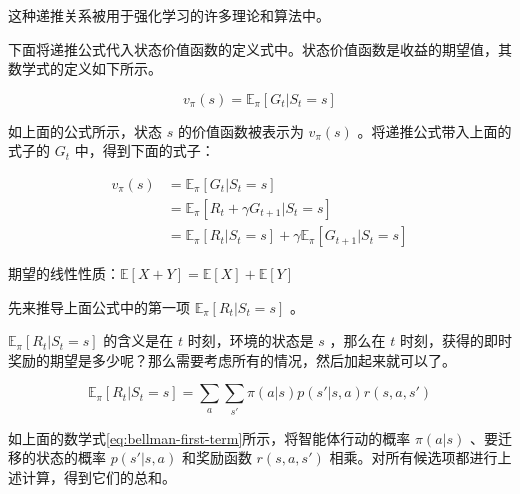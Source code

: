 \documentclass[lang=cn,newtx,10pt,scheme=chinese]{elegantbook}
\begin{document}
这种递推关系被用于强化学习的许多理论和算法中。

下面将递推公式代入状态价值函数的定义式中。状态价值函数是收益的期望值，其数学式的定义如下所示。

\begin{equation}
v_\pi(s) = \mathbb{E}_\pi[G_t|S_t=s]
\end{equation}

如上面的公式所示，状态 $s$ 的价值函数被表示为 $v_\pi(s)$ 。将递推公式带入上面的式子的 $G_t$ 中，得到下面的式子：

\begin{equation}
\begin{aligned}
v_\pi(s) &= \mathbb{E}_\pi[G_t|S_t=s] \\
&= \mathbb{E}_\pi[R_t+\gamma G_{t+1}|S_t=s] \\
&= \mathbb{E}_\pi[R_t|S_t=s] + \gamma\mathbb{E}_\pi[G_{t+1}|S_t=s]
\end{aligned}
\end{equation}

\begin{marker}
期望的线性性质：$\mathbb{E}[X+Y] = \mathbb{E}[X] + \mathbb{E}[Y]$
\end{marker}

先来推导上面公式中的第一项 $\mathbb{E}_\pi[R_t|S_t=s]$ 。

$\mathbb{E}_\pi[R_t|S_t=s]$ 的含义是在 $t$ 时刻，环境的状态是 $s$ ，那么在 $t$ 时刻，获得的即时奖励的期望是多少呢？那么需要考虑所有的情况，然后加起来就可以了。

\begin{equation}\label{eq:bellman-first-term}
\mathbb{E}_\pi[R_t|S_t=s]=\sum_a\sum_{s'}\pi(a|s)p(s'|s,a)r(s,a,s')
\end{equation}

如上面的数学式\ref{eq:bellman-first-term}所示，将智能体行动的概率 $\pi(a|s)$ 、要迁移的状态的概率 $p(s'|s,a)$ 和奖励函数 $r(s,a,s')$ 相乘。对所有候选项都进行上述计算，得到它们的总和。
\end{document}
